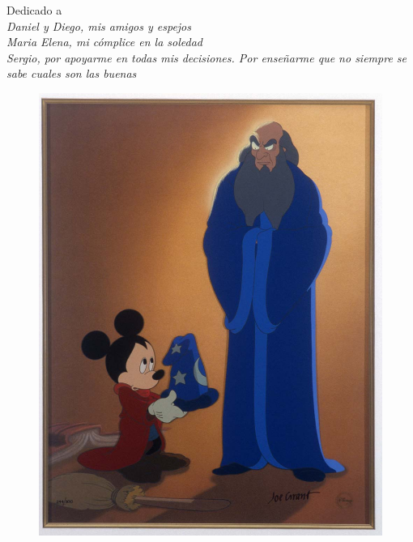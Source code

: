 \thispagestyle{empty}
{}

\vspace*{2cm}


\begin{center}
    Dedicado a \\ \medskip
    {\it
        Daniel y Diego, mis amigos y espejos \\ \smallskip
        Maria Elena, mi cómplice en la soledad \\ \smallskip
        Sergio, por apoyarme en todas mis decisiones. Por enseñarme que no siempre se sabe cuales son las buenas \\ \smallskip
    }

\end{center}

\vspace*{1cm}

\begin{center}
    \begin{figure}[h!]
        \includegraphics[width=1.0\textwidth]{fantasia}
    \end{figure}
\end{center}
\null

